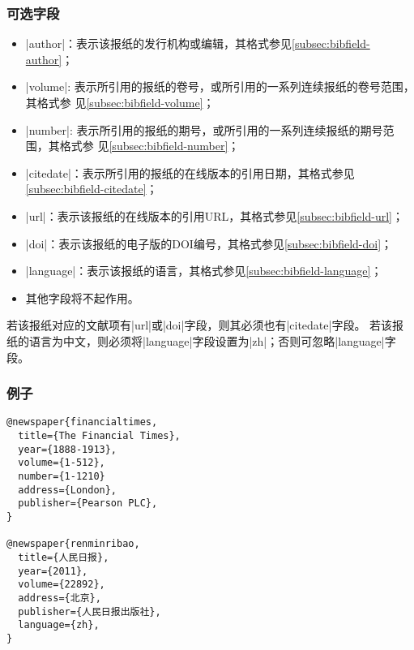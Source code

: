 \subsubsection{可选字段}

\begin{itemize}
\item |author|：表示该报纸的发行机构或编辑，其格式参见\ref{subsec:bibfield-author}；
\item |volume|: 表示所引用的报纸的卷号，或所引用的一系列连续报纸的卷号范围，其格式参
  见\ref{subsec:bibfield-volume}；
\item |number|: 表示所引用的报纸的期号，或所引用的一系列连续报纸的期号范围，其格式参
  见\ref{subsec:bibfield-number}；
\item |citedate|：表示所引用的报纸的在线版本的引用日期，其格式参见\ref{subsec:bibfield-citedate}；
\item |url|：表示该报纸的在线版本的引用URL，其格式参见\ref{subsec:bibfield-url}；
\item |doi|：表示该报纸的电子版的DOI编号，其格式参见\ref{subsec:bibfield-doi}；
\item |language|：表示该报纸的语言，其格式参见\ref{subsec:bibfield-language}；
\item 其他字段将不起作用。
\end{itemize}

\begin{note}
若该报纸对应的文献项有|url|或|doi|字段，则其必须也有|citedate|字段。
若该报纸的语言为中文，则必须将|language|字段设置为|zh|；否则可忽略|language|字段。
\end{note}

\subsubsection{例子}

\begin{verbatim}
@newspaper{financialtimes,
  title={The Financial Times},
  year={1888-1913},
  volume={1-512},
  number={1-1210}
  address={London},
  publisher={Pearson PLC},  
}

@newspaper{renminribao,
  title={人民日报},
  year={2011},
  volume={22892},
  address={北京},
  publisher={人民日报出版社},
  language={zh},
}
\end{verbatim}
